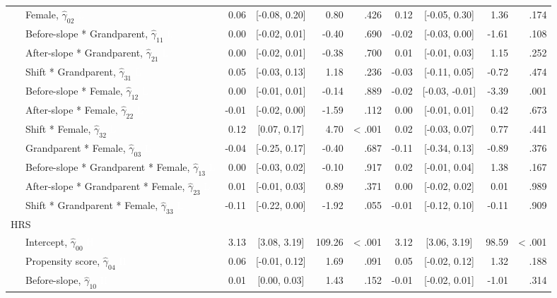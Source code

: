\documentclass[
  english,
  man,floatsintext]{apa7}
\newenvironment{lltable}{\begin{landscape}\begin{center}\begin{ThreePartTable}}{\end{ThreePartTable}\end{center}\end{landscape}}
\begin{document}
\begin{lltable}
{\begin{longtable}{lrcrrrcrr}
\ \ \ Female, $\hat{\gamma}_{02}$ \textcolor{white}{L} & 0.06 & {}[-0.08, 0.20] & 0.80 & .426 & 0.12 & {}[-0.05, 0.30] & 1.36 & .174\\
\ \ \ Before-slope * Grandparent, $\hat{\gamma}_{11}$ \textcolor{white}{L} & 0.00 & {}[-0.02, 0.01] & -0.40 & .690 & -0.02 & {}[-0.03, 0.00] & -1.61 & .108\\
\ \ \ After-slope * Grandparent, $\hat{\gamma}_{21}$ \textcolor{white}{L} & 0.00 & {}[-0.02, 0.01] & -0.38 & .700 & 0.01 & {}[-0.01, 0.03] & 1.15 & .252\\
\ \ \ Shift * Grandparent, $\hat{\gamma}_{31}$ \textcolor{white}{L} & 0.05 & {}[-0.03, 0.13] & 1.18 & .236 & -0.03 & {}[-0.11, 0.05] & -0.72 & .474\\
\ \ \ Before-slope * Female, $\hat{\gamma}_{12}$ \textcolor{white}{L} & 0.00 & {}[-0.01, 0.01] & -0.14 & .889 & -0.02 & {}[-0.03, -0.01] & -3.39 & .001\\
\ \ \ After-slope * Female, $\hat{\gamma}_{22}$ \textcolor{white}{L} & -0.01 & {}[-0.02, 0.00] & -1.59 & .112 & 0.00 & {}[-0.01, 0.01] & 0.42 & .673\\
\ \ \ Shift * Female, $\hat{\gamma}_{32}$ \textcolor{white}{L} & 0.12 & {}[0.07, 0.17] & 4.70 & < .001 & 0.02 & {}[-0.03, 0.07] & 0.77 & .441\\
\ \ \ Grandparent * Female, $\hat{\gamma}_{03}$ \textcolor{white}{L} & -0.04 & {}[-0.25, 0.17] & -0.40 & .687 & -0.11 & {}[-0.34, 0.13] & -0.89 & .376\\
\ \ \ Before-slope * Grandparent * Female, $\hat{\gamma}_{13}$ \textcolor{white}{L} & 0.00 & {}[-0.03, 0.02] & -0.10 & .917 & 0.02 & {}[-0.01, 0.04] & 1.38 & .167\\
\ \ \ After-slope * Grandparent * Female, $\hat{\gamma}_{23}$ \textcolor{white}{L} & 0.01 & {}[-0.01, 0.03] & 0.89 & .371 & 0.00 & {}[-0.02, 0.02] & 0.01 & .989\\
\ \ \ Shift * Grandparent * Female, $\hat{\gamma}_{33}$ \textcolor{white}{L} & -0.11 & {}[-0.22, 0.00] & -1.92 & .055 & -0.01 & {}[-0.12, 0.10] & -0.11 & .909\\
HRS &  &  &  &  &  &  &  & \\
\ \ \ Intercept, $\hat{\gamma}_{00}$ \textcolor{white}{H} & 3.13 & {}[3.08, 3.19] & 109.26 & < .001 & 3.12 & {}[3.06, 3.19] & 98.59 & < .001\\
\ \ \ Propensity score, $\hat{\gamma}_{04}$ \textcolor{white}{H} & 0.06 & {}[-0.01, 0.12] & 1.69 & .091 & 0.05 & {}[-0.02, 0.12] & 1.32 & .188\\
\ \ \ Before-slope, $\hat{\gamma}_{10}$ \textcolor{white}{H} & 0.01 & {}[0.00, 0.03] & 1.43 & .152 & -0.01 & {}[-0.02, 0.01] & -1.01 & .314\\

\end{longtable}}
\end{lltable}
\end{document}
